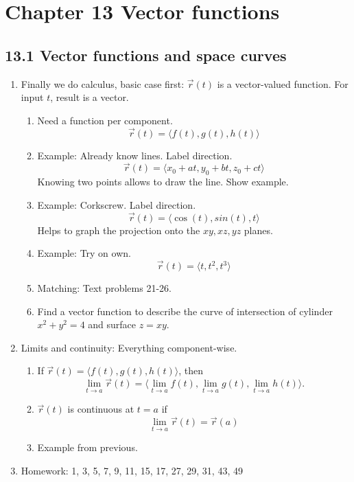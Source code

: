 \documentclass{article}
\begin{document}
\section{Chapter 13 Vector functions}

\subsection{13.1 Vector functions and space curves}
\begin{enumerate}
\item Finally we do calculus, basic case first: $\vec{r}(t)$ is a vector-valued function. For input $t$, result is a vector. 
\begin{enumerate}
\item Need a function per component.
\[
\vec{r}(t) = \langle f(t), g(t), h(t) \rangle
\]
\item Example: Already know lines. Label direction.
\[
\vec{r}(t) = \langle x_0 + at, y_0 + bt, z_0 + ct \rangle
\]
Knowing two points allows to draw the line. Show example.
\item Example: Corkscrew. Label direction.
\[
\vec{r}(t) = \langle \cos(t), sin(t), t \rangle
\]
Helps to graph the projection onto the $xy, xz, yz$ planes.
\item Example: Try on own.
\[
\vec{r}(t) = \langle t, t^2, t^3 \rangle
\]
\item Matching: Text problems 21-26.

\item Find a vector function to describe the curve of intersection of cylinder $x^2+y^2=4$ and surface $z=xy$. 
\end{enumerate}

\item Limits and continuity: Everything component-wise.
\begin{enumerate}
\item If $\vec{r}(t) = \langle f(t), g(t), h(t) \rangle$, then
\[
\lim_{t \rightarrow a} \vec{r}(t) = \langle \lim_{t \rightarrow a} f(t), \lim_{t \rightarrow a} g(t), \lim_{t \rightarrow a} h(t) \rangle.
\]
\item $\vec{r}(t)$ is continuous at $t=a$ if
\[
\lim_{t \rightarrow a} \vec{r}(t) = \vec{r}(a)
\]
\item Example from previous.
\end{enumerate}

\item Homework: 1, 3, 5, 7, 9, 11, 15, 17, 27, 29, 31, 43, 49

\end{enumerate}
\end{document}
